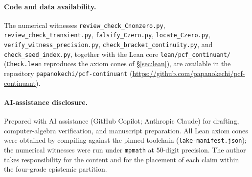 \documentclass[11pt]{article}
\begin{document}
\paragraph{Code and data availability.}
The numerical witnesses
\texttt{review\_check\_Cnonzero.py}, \texttt{review\_check\_transient.py},
\texttt{falsify\_Czero.py}, \texttt{locate\_Czero.py},
\texttt{verify\_witness\_precision.py}, \texttt{check\_bracket\_continuity.py}, and
\texttt{check\_seed\_index.py}, together with the Lean core
\texttt{lean/pcf\_continuant/} (\texttt{Check.lean} reproduces the axiom cones of
\S\ref{sec:lean}), are available in the repository
\texttt{papanokechi/pcf-continuant}
(\url{https://github.com/papanokechi/pcf-continuant}).

\paragraph{AI-assistance disclosure.}
Prepared with AI assistance (GitHub Copilot; Anthropic Claude) for drafting,
computer-algebra verification, and manuscript preparation. All Lean axiom cones
were obtained by compiling against the pinned toolchain
(\texttt{lake-manifest.json}); the numerical witnesses were run under
\texttt{mpmath} at $50$-digit precision. The author takes responsibility for the
content and for the placement of each claim within the four-grade epistemic
partition.
\end{document}
